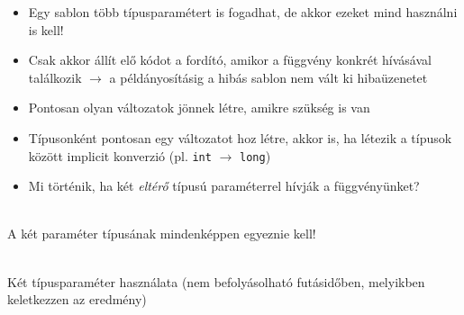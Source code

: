 \documentclass[usenames,dvipsnames,aspectratio=169]{beamer}
\begin{document}
\begin{frame}
    \begin{exampleblock}{}
        \scriptsize
        
    \end{exampleblock}
\end{frame}

\begin{frame}
    \begin{itemize}
        \item Egy sablon több típusparamétert is fogadhat, de akkor ezeket mind használni is kell!
        \item Csak akkor állít elő kódot a fordító, amikor a függvény konkrét hívásával találkozik $\to$ a példányosításig a hibás sablon nem vált ki hibaüzenetet
        \item Pontosan olyan változatok jönnek létre, amikre szükség is van
        \item Típusonként pontosan egy változatot hoz létre, akkor is, ha létezik a típusok között implicit konverzió (pl. \texttt{int} $\to$ \texttt{long})
        \item Mi történik, ha két \emph{eltérő} típusú paraméterrel hívják a függvényünket?
    \end{itemize}
\end{frame}

\begin{frame}
    \begin{exampleblock}{}
        \scriptsize
        
    \end{exampleblock}
\end{frame}

\begin{frame}
    \begin{description}[m]
        \item[Probléma:] \hfill \\ A két paraméter típusának mindenképpen egyeznie kell!
        \item[Félmegoldás:] \hfill \\ Két típusparaméter használata (nem befolyásolható futásidőben, melyikben keletkezzen az eredmény)  
    \end{description}
\end{frame}
\end{document}

